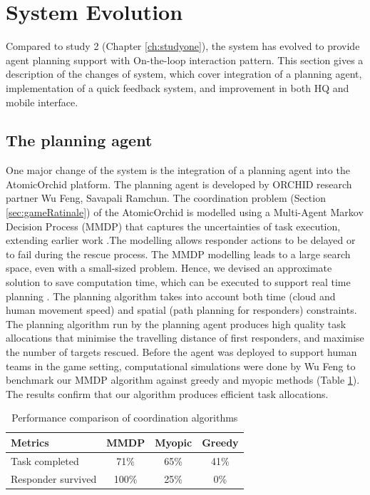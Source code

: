 \section{System Evolution}\label{sec:studytwosystem}
Compared to study 2 (Chapter \ref{ch:studyone}), the system has evolved to provide agent planning support with On-the-loop interaction pattern. This section gives a description of the changes of system, which cover integration of a planning agent, implementation of a quick feedback system, and improvement in both HQ and mobile interface.

\subsection{The planning agent}\label{sec:studyoneagent}
One major change of the system is the integration of a planning agent into the AtomicOrchid platform. The planning agent is developed by ORCHID research partner Wu Feng, Savapali Ramchun. The coordination problem (Section \ref{sec:gameRatinale}) of the AtomicOrchid is modelled using a Multi-Agent Markov Decision Process (MMDP) that captures the uncertainties of task execution, extending earlier work \cite{Ramchurn2010}.The modelling allows responder actions to be delayed or to fail during the rescue process. The MMDP modelling leads to a large search space, even with a small-sized problem. Hence, we devised an approximate solution to save computation time, which can be executed to support real time planning \cite{Wu2015}. The planning algorithm takes into account both time (cloud and human movement speed) and spatial (path planning for responders) constraints. The planning algorithm run by the planning agent produces high quality task allocations that minimise the travelling distance of first responders, and maximise the number of targets rescued. Before the agent was deployed to support human teams in the game setting, computational simulations were done by Wu Feng to benchmark our MMDP algorithm against greedy and myopic methods (Table  \ref{tab:alg}). The results confirm that our algorithm produces efficient task allocations.\\

\begin{table}[h]
\footnotesize
\centering
\begin{tabular}{l|ccc}
Metrics            & \multicolumn{1}{l}{MMDP} & \multicolumn{1}{l}{Myopic} & \multicolumn{1}{l}{Greedy} \\ \hline
Task completed     & 71\%                     & 65\%                       & 41\%                       \\
Responder survived & 100\%                    & 25\%                       & 0\%                       
\end{tabular}
\caption{Performance comparison of coordination algorithms}
\label{tab:alg}
\end{table}

